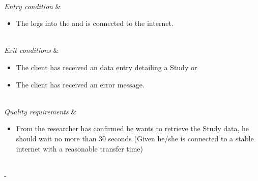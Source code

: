 \begin{table}[h!]
\begin{tabu}
\begin{enumerate}[leftmargin=*,topsep=0pt,itemsep=-1ex]
	\end{enumerate} \\
	\hline
	\textit{Entry condition} &
	\vspace{-3mm}
	\begin{itemize}[leftmargin=*,topsep=0pt,itemsep=-1ex]
		\item The \researcher logs into the \client and is connected to the internet.
	\end{itemize} \\
	\hline
	\textit{Exit conditions} &
	\vspace{-3mm}
	\begin{itemize}[leftmargin=*,topsep=0pt,itemsep=-1ex]
		\item The client has received an data entry detailing a Study or
		\item The client has received an error message.
	\end{itemize} \\
	\hline
	\textit{Quality \newline requirements} &
	\vspace{-3mm}
	\begin{itemize}[leftmargin=*,topsep=0pt,itemsep=-1ex]
		\item From the researcher has confirmed he wants to retrieve the Study data,  he should wait no more than 30 seconds (Given he/she is connected to a stable internet with a reasonable transfer time)
	\end{itemize} \\
	\tabucline[1.5pt]-
\end{tabu}
\caption{Use case: RetrieveStudyInformation}
\label{uc:RetrieveStudyInformation}
\end{table}
